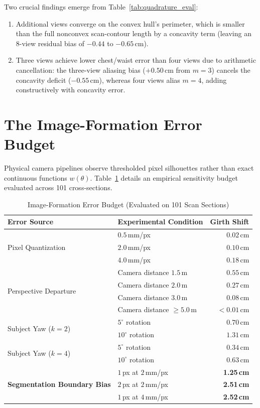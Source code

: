 \documentclass[journal]{IEEEtran}
\begin{document}
Two crucial findings emerge from Table~\ref{tab:quadrature_eval}:
\begin{enumerate}
    \item Additional views converge on the convex hull's perimeter, which is smaller than the full nonconvex scan-contour length by a concavity term (leaving an 8-view residual bias of $-0.44$ to $-0.65$\,cm).
    \item Three views achieve lower chest/waist error than four views due to arithmetic cancellation: the three-view aliasing bias ($+0.50$\,cm from $m=3$) cancels the concavity deficit ($-0.55$\,cm), whereas four views alias $m=4$, adding constructively with concavity error.
\end{enumerate}

\section{The Image-Formation Error Budget}
\label{sec:error_budget}

Physical camera pipelines observe thresholded pixel silhouettes rather than exact continuous functions $w(\theta)$. Table~\ref{tab:image_formation_budget} details an empirical sensitivity budget evaluated across 101 cross-sections.

\begin{table}[!t]
\caption{Image-Formation Error Budget (Evaluated on 101 Scan Sections)}
\label{tab:image_formation_budget}
\centering
\begin{tabular}{llr}
\toprule
\textbf{Error Source} & \textbf{Experimental Condition} & \textbf{Girth Shift} \\
\midrule
\multirow{3}{*}{Pixel Quantization} 
& $0.5$\,mm/px & $0.02$\,cm \\
& $2.0$\,mm/px & $0.10$\,cm \\
& $4.0$\,mm/px & $0.18$\,cm \\
\midrule
\multirow{4}{*}{Perspective Departure} 
& Camera distance $1.5$\,m & $0.55$\,cm \\
& Camera distance $2.0$\,m & $0.27$\,cm \\
& Camera distance $3.0$\,m & $0.08$\,cm \\
& Camera distance $\ge 5.0$\,m & $< 0.01$\,cm \\
\midrule
\multirow{2}{*}{Subject Yaw ($k=2$)} 
& $5^\circ$ rotation & $0.70$\,cm \\
& $10^\circ$ rotation & $1.31$\,cm \\
\midrule
\multirow{2}{*}{Subject Yaw ($k=4$)} 
& $5^\circ$ rotation & $0.34$\,cm \\
& $10^\circ$ rotation & $0.63$\,cm \\
\midrule
\multirow{3}{*}{\textbf{Segmentation Boundary Bias}} 
& $1$\,px at $2$\,mm/px & \textbf{1.25\,cm} \\
& $2$\,px at $2$\,mm/px & \textbf{2.51\,cm} \\
& $1$\,px at $4$\,mm/px & \textbf{2.52\,cm} \\
\bottomrule
\end{tabular}
\end{table}
\end{document}
